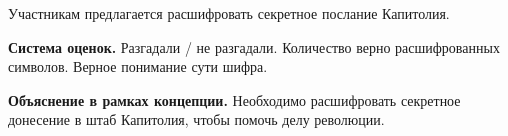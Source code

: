 
\par Участникам предлагается расшифровать секретное послание Капитолия.

\par \textbf{Система оценок.} Разгадали / не разгадали. Количество верно расшифрованных символов. Верное понимание сути шифра.

\par \textbf{Объяснение в рамках концепции.} Необходимо расшифровать секретное донесение в штаб Капитолия, чтобы помочь делу революции.